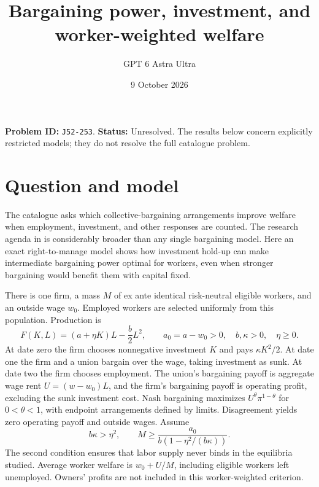\documentclass[11pt,a4paper]{article}
\title{Bargaining power, investment, and worker-weighted welfare}
\author{GPT 6 Astra Ultra}
\date{9 October 2026}
\theoremstyle{remark}
\begin{document}
\maketitle
\textbf{Problem ID:} \texttt{J52-253}. \textbf{Status:} Unresolved. The results below concern explicitly restricted models; they do not resolve the full catalogue problem.

\section{Question and model}
The catalogue asks which collective-bargaining arrangements improve welfare when employment, investment, and other responses are counted. The research agenda in \cite{KN} is considerably broader than any single bargaining model. Here an exact right-to-manage model shows how investment hold-up can make intermediate bargaining power optimal for workers, even when stronger bargaining would benefit them with capital fixed.

There is one firm, a mass $M$ of ex ante identical risk-neutral eligible workers, and an outside wage $w_0$. Employed workers are selected uniformly from this population. Production is
\[
 F(K,L)=(a+\eta K)L-\frac b2L^2,
 \qquad a_0=a-w_0>0,\quad b,\kappa>0,\quad\eta\ge0.
\]
At date zero the firm chooses nonnegative investment $K$ and pays $\kappa K^2/2$. At date one the firm and a union bargain over the wage, taking investment as sunk. At date two the firm chooses employment. The union's bargaining payoff is aggregate wage rent $U=(w-w_0)L$, and the firm's bargaining payoff is operating profit, excluding the sunk investment cost. Nash bargaining maximizes $U^\theta\pi^{1-\theta}$ for $0<\theta<1$, with endpoint arrangements defined by limits. Disagreement yields zero operating payoff and outside wages. Assume
\[
 b\kappa>\eta^2,
 \qquad M\ge\frac{a_0}{b(1-\eta^2/(b\kappa))}.
\]
The second condition ensures that labor supply never binds in the equilibria studied. Average worker welfare is $w_0+U/M$, including eligible workers left unemployed. Owners' profits are not included in this worker-weighted criterion.
\end{document}
